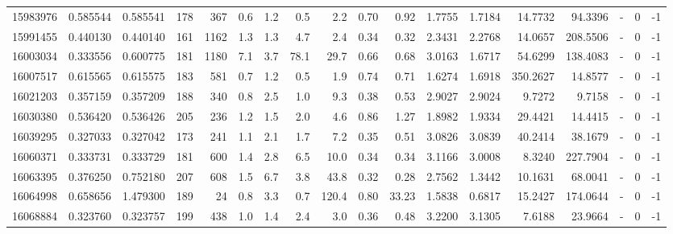 \begin{tabular}{rrrrrrrrrrrrrrrlrr}
  15983976 & 0.585544 &   0.585541 &  178 &  367 &      0.6 &      1.2 &     0.5 &      2.2 &       0.70 &        0.92 &  1.7755 &  1.7184 &   14.7732 &   94.3396 &             - &        0 &         -1 \\
  15991455 & 0.440130 &   0.440140 &  161 & 1162 &      1.3 &      1.3 &     4.7 &      2.4 &       0.34 &        0.32 &  2.3431 &  2.2768 &   14.0657 &  208.5506 &             - &        0 &         -1 \\
  16003034 & 0.333556 &   0.600775 &  181 & 1180 &      7.1 &      3.7 &    78.1 &     29.7 &       0.66 &        0.68 &  3.0163 &  1.6717 &   54.6299 &  138.4083 &             - &        0 &         -1 \\
  16007517 & 0.615565 &   0.615575 &  183 &  581 &      0.7 &      1.2 &     0.5 &      1.9 &       0.74 &        0.71 &  1.6274 &  1.6918 &  350.2627 &   14.8577 &             - &        0 &         -1 \\
  16021203 & 0.357159 &   0.357209 &  188 &  340 &      0.8 &      2.5 &     1.0 &      9.3 &       0.38 &        0.53 &  2.9027 &  2.9024 &    9.7272 &    9.7158 &             - &        0 &         -1 \\
  16030380 & 0.536420 &   0.536426 &  205 &  236 &      1.2 &      1.5 &     2.0 &      4.6 &       0.86 &        1.27 &  1.8982 &  1.9334 &   29.4421 &   14.4415 &             - &        0 &         -1 \\
  16039295 & 0.327033 &   0.327042 &  173 &  241 &      1.1 &      2.1 &     1.7 &      7.2 &       0.35 &        0.51 &  3.0826 &  3.0839 &   40.2414 &   38.1679 &             - &        0 &         -1 \\
  16060371 & 0.333731 &   0.333729 &  181 &  600 &      1.4 &      2.8 &     6.5 &     10.0 &       0.34 &        0.34 &  3.1166 &  3.0008 &    8.3240 &  227.7904 &             - &        0 &         -1 \\
  16063395 & 0.376250 &   0.752180 &  207 &  608 &      1.5 &      6.7 &     3.8 &     43.8 &       0.32 &        0.28 &  2.7562 &  1.3442 &   10.1631 &   68.0041 &             - &        0 &         -1 \\
  16064998 & 0.658656 &   1.479300 &  189 &   24 &      0.8 &      3.3 &     0.7 &    120.4 &       0.80 &       33.23 &  1.5838 &  0.6817 &   15.2427 &  174.0644 &             - &        0 &         -1 \\
  16068884 & 0.323760 &   0.323757 &  199 &  438 &      1.0 &      1.4 &     2.4 &      3.0 &       0.36 &        0.48 &  3.2200 &  3.1305 &    7.6188 &   23.9664 &             - &        0 &         -1 \\

\end{tabular}
